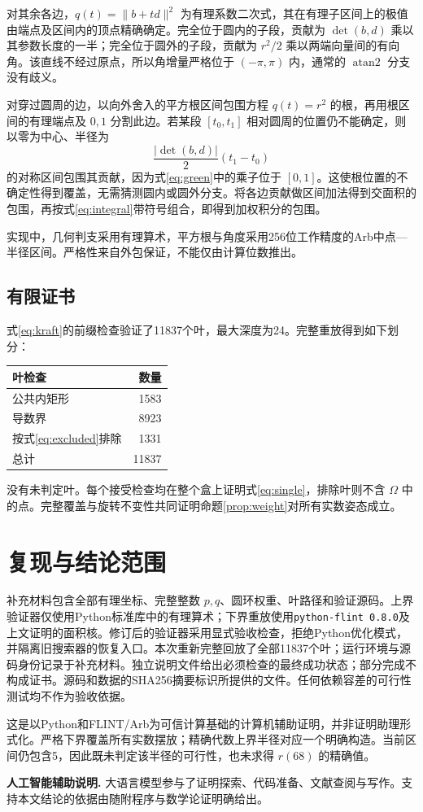 \documentclass[11pt]{article}
\begin{document}
对其余各边，$q(t)=\|b+td\|^2$ 为有理系数二次式，其在有理子区间上的极值由端点及区间内的顶点精确确定。完全位于圆内的子段，贡献为 $\det(b,d)$ 乘以其参数长度的一半；完全位于圆外的子段，贡献为 $r^2/2$ 乘以两端向量间的有向角。该直线不经过原点，所以角增量严格位于 $(-\pi,\pi)$ 内，通常的 $\operatorname{atan2}$ 分支没有歧义。

对穿过圆周的边，以向外舍入的平方根区间包围方程 $q(t)=r^2$ 的根，再用根区间的有理端点及 $0,1$ 分割此边。若某段 $[t_0,t_1]$ 相对圆周的位置仍不能确定，则以零为中心、半径为
\[
\frac{|\det(b,d)|}{2}(t_1-t_0)
\]
的对称区间包围其贡献，因为式\eqref{eq:green}中的乘子位于 $[0,1]$。这使根位置的不确定性得到覆盖，无需猜测圆内或圆外分支。将各边贡献做区间加法得到交面积的包围，再按式\eqref{eq:integral}带符号组合，即得到加权积分的包围。

实现中，几何判支采用有理算术，平方根与角度采用256位工作精度的Arb中点—半径区间\cite{johansson}。严格性来自外包保证，不能仅由计算位数推出。

\subsection{有限证书}
式\eqref{eq:kraft}的前缀检查验证了11837个叶，最大深度为24。完整重放得到如下划分：
\begin{center}
\begin{tabular}{lr}
\toprule
叶检查 & 数量\\
\midrule
公共内矩形 & 1583\\
导数界 & 8923\\
按式\eqref{eq:excluded}排除 & 1331\\
\midrule
总计 & 11837\\
\bottomrule
\end{tabular}
\end{center}
没有未判定叶。每个接受检查均在整个盒上证明式\eqref{eq:single}，排除叶则不含 $\Omega$ 中的点。完整覆盖与旋转不变性共同证明命题\ref{prop:weight}对所有实数姿态成立。

\section{复现与结论范围}
补充材料包含全部有理坐标、完整整数 $p,q$、圆环权重、叶路径和验证源码。上界验证器仅使用Python标准库中的有理算术；下界重放使用\texttt{python-flint 0.8.0}及上文证明的面积核。修订后的验证器采用显式验收检查，拒绝Python优化模式，并隔离旧搜索器的恢复入口。本次重新完整回放了全部11837个叶；运行环境与源码身份记录于补充材料。独立说明文件给出必须检查的最终成功状态；部分完成不构成证书。源码和数据的SHA256摘要标识所提供的文件。任何依赖容差的可行性测试均不作为验收依据。

这是以Python和FLINT/Arb为可信计算基础的计算机辅助证明，并非证明助理形式化。严格下界覆盖所有实数摆放；精确代数上界半径对应一个明确构造。当前区间仍包含5，因此既未判定该半径的可行性，也未求得 $r(68)$ 的精确值。

\medskip
\noindent\textbf{人工智能辅助说明.} 大语言模型参与了证明探索、代码准备、文献查阅与写作。支持本文结论的依据由随附程序与数学论证明确给出。

\begingroup
\raggedright

\endgroup
\end{document}

